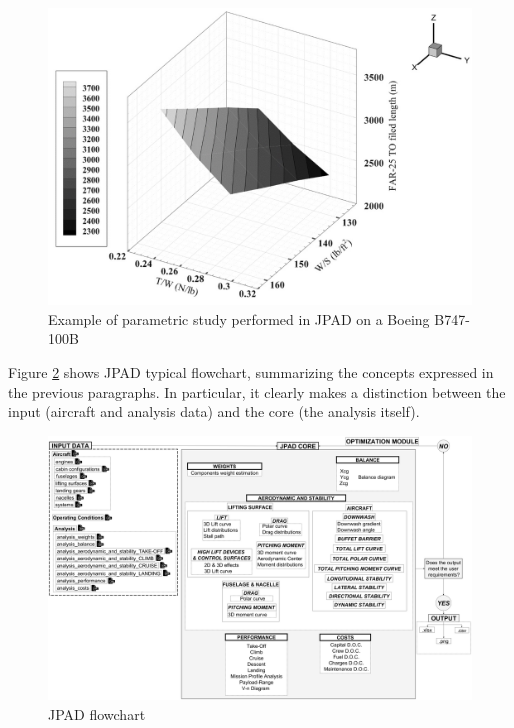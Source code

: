 %
\begin{figure}[htbp]
\centering
\includegraphics[height=0.27\textheight]{Immagini/Capitolo1/JPADParametricStudy}
\caption{Example of parametric study performed in JPAD on a Boeing B747-100B}
\label{fig:JPADParametricStudy}
\end{figure}
%

\bigskip
\noindent
Figure \ref{fig:JPADFlowchart} shows JPAD typical flowchart, summarizing the concepts expressed in the previous paragraphs. In particular, it clearly makes a distinction between the input (aircraft and analysis data) and the core (the analysis itself).
%
\begin{figure}[htbp]
\centering
\includegraphics[height=0.36\textheight]{Immagini/Capitolo1/JPADFlowchart}
\caption{JPAD flowchart}
\label{fig:JPADFlowchart}
\end{figure}
%

